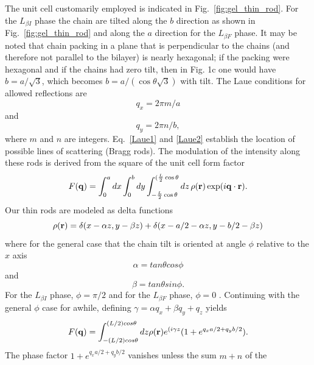 The unit cell customarily employed is indicated in Fig.~\ref{fig:gel_thin_rod}.  
For the $L_{{\beta}I}$ phase the chain are tilted along the $b$ direction 
as shown in Fig.~\ref{fig:gel_thin_rod} and along the $a$ direction for 
the $L_{{\beta}F}$ phase.  
It may be noted that chain packing in a plane that is perpendicular to the 
chains (and therefore not parallel to the bilayer) is nearly hexagonal; if 
the packing were hexagonal and if the chains had zero tilt, then in Fig. 1c 
one would have $b=a/\sqrt{3}$, which becomes $b=a/(\cos{\theta}\sqrt{3})$ with tilt.  
The Laue conditions for allowed reflections are 
\begin{equation}\label{Laue1}
q_x=2{\pi}m/a 
\end{equation}
and
\begin{equation}\label{Laue2}
q_y=2{\pi}n/b, 
\end{equation}
where $m$ and $n$ are integers.
Eq.~\ref{Laue1} and \ref{Laue2} 
establish the location of possible lines of scattering (Bragg rods). 
The modulation of the intensity along these rods is derived from the square 
of the unit cell form factor
\begin{equation}\label{S(q)}
  F(\mathbf{q}) = \int_{0}^{a}dx\int_{0}^{b}dy
  \int_{-\frac{L}{2}\cos\theta}^{(\frac{L}{2}\cos\theta}
  \mathop{dz}\rho(\mathbf{r})\exp(i\mathbf{q}\cdot\mathbf{r}).
\end{equation}
Our thin rods are modeled as delta functions
\begin{equation}\label{rods}
\rho(\bold{r})=\delta(x-{\alpha}z,y-{\beta}z)+\delta(x-a/2-{\alpha}z,y-b/2-{\beta}z)
\end{equation}
where for the general case that the chain tilt is oriented at angle $\phi$ 
relative to the $x$ axis 
\begin{equation}\label{alpha}
\alpha=tan{\theta}cos{\phi}
\end{equation}
and
\begin{equation}\label{beta}
\beta=tan{\theta}sin{\phi}.
\end{equation}
For the $L_{{\beta}I}$ phase, $\phi={\pi}/2$ and for the $L_{{\beta}F}$ phase, 
$\phi=0$ .  Continuing with the general $\phi$ case for awhile,
defining $\gamma = {\alpha}q_x+{\beta}q_y+q_z$ yields
\begin{equation}\label{S(q)}
F(\bold{q}) = \int_{-(L/2)cos{\theta}}^{(L/2)cos{\theta}}dz\rho(\bold{r})e^{(i{\gamma}z}(1+e^{q_xa/2+q_yb/2}).
\end{equation}
The phase factor $1+e^{q_xa/2+q_yb/2}$ vanishes unless the sum $m+n$ of the 
